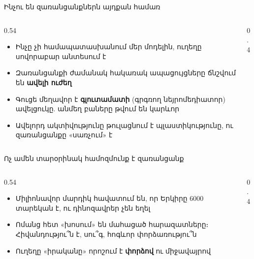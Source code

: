 \begin{frame}{Ինչու են զառանցանքներն այդքան համառ}
  \begin{columns}[c]
    \begin{column}{0.54\textwidth}
      \begin{itemize}
        \item Ինչը չի համապատասխանում մեր մոդելին, ուղեղը սովորաբար անտեսում է
        \item<2-> Զառանցանքի ժամանակ հակառակ ապացույցները ճնշվում են \textbf{ավելի ուժեղ}
        \item<3-> Գուցե մեղավոր է \textbf{գլուտամատի} (գրգռող նեյրոմեդիատոր) ավելցուկը. անմեղ բաները թվում են կարևոր
        \item<4-> Ավելորդ ակտիվությունը թուլացնում է պլաստիկությունը, ու զառանցանքը «սառչում» է
      \end{itemize}
    \end{column}
    \begin{column}{0.4\textwidth}
    \end{column}
  \end{columns}
\end{frame}

\begin{frame}{Ոչ ամեն տարօրինակ համոզմունք է զառանցանք}
  \begin{columns}[c]
    \begin{column}{0.54\textwidth}
      \begin{itemize}
        \item Միլիոնավոր մարդիկ հավատում են, որ Երկիրը 6000 տարեկան է, ու դինոզավրեր չեն եղել
        \item Ոմանց հետ «խոսում» են մահացած հարազատները։ Հիվանդությու՞ն է, սու՞գ, հոգևոր փորձառությու՞ն
        \item<2-> Ուղեղը «իրականը» որոշում է \textbf{փորձով} ու միջավայրով
      \end{itemize}
    \end{column}
    \begin{column}{0.4\textwidth}
    \end{column}
  \end{columns}
\end{frame}

